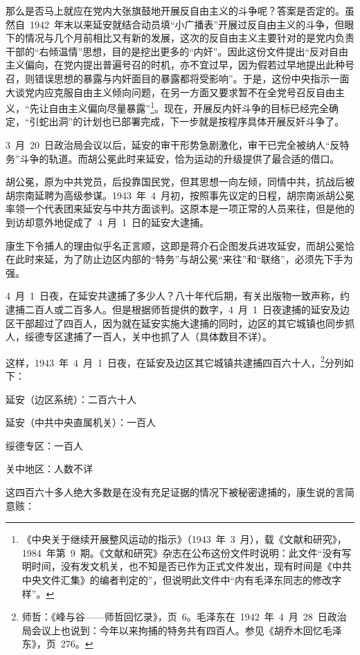 那么是否马上就应在党内大张旗鼓地开展反自由主义的斗争呢？答案是否定的。虽然自~1942~年末以来延安就结合动员填“小广播表”开展过反自由主义的斗争，但眼下的情况与几个月前相比又有新的发展，这次的反自由主义主要针对的是党内负责干部的“右倾温情”思想，目的是挖出更多的“内奸”。因此这份文件提出“反对自由主义偏向，在党内提出普遍号召的时机，亦不宜过早，因为假若过早地提出此种号召，则错误思想的暴露与内奸面目的暴露都将受影响”。于是，这份中央指示一面大谈党内应克服自由主义倾向问题，在另一方面又要求暂不在全党号召反自由主义，“先让自由主义偏向尽量暴露”\footnote{《中央关于继续开展整风运动的指示》（1943~年~3~月），载《文献和研究》，1984~年第~9~期。《文献和研究》杂志在公布这份文件时说明：此文件“没有写明时间，没有发文机关，也不知是否已作为正式文件发出，现有时间是《中共中央文件汇集》的编者判定的”，但说明此文件中“内有毛泽东同志的修改字样”。}。现在，开展反内奸斗争的目标已经完全确定，“引蛇出洞”的计划也已部署完成，下一步就是按程序具体开展反奸斗争了。

3~月~20~日政治局会议以后，延安的审干形势急剧激化，审干已完全被纳人“反特务”斗争的轨道。而胡公冕此时来延安，恰为运动的升级提供了最合适的借口。

胡公冕，原为中共党员，后投靠国民党，但其思想一向左倾，同情中共，抗战后被胡宗南延聘为高级参谋。1943~年~4~月初，按照事先议定的日程，胡宗南派胡公冕率领一个代表团来延安与中共方面谈判。这原本是一项正常的人员来往，但是他的到访却意外地促成了~4~月~1~日的延安大逮捕。

康生下令捕人的理由似乎名正言顺，这即是蒋介石企图发兵进攻延安，而胡公冕恰在此时来延，为了防止边区内部的“特务”与胡公冕“来往”和“联络”，必须先下手为强。

4~月~1~日夜，在延安共逮捕了多少人？八十年代后期，有关出版物一致声称，约逮捕二百人或二百多人。但是根据师哲提供的数字，4~月~1~日夜逮捕的延安及边区干部超过了四百人，因为就在延安实施大逮捕的同时，边区的其它城镇也同步抓人，绥德专区逮捕了一百人，关中也抓了人（具体数目不详）。

这样，1943~年~4~月~1~日夜，在延安及边区其它城镇共逮捕四百六十人，\footnote{师哲：《峰与谷——师哲回忆录》，页~6。毛泽东在~1942~年~4~月~28~日政治局会议上也说到：今年以来拘捕的特务共有四百人。参见《胡乔木回忆毛泽东》，页~276。}分列如下：

延安（边区系统）：二百六十人

延安（中共中央直属机关）：一百人

绥德专区：一百人

关中地区：人数不详

这四百六十多人绝大多数是在没有充足证据的情况下被秘密逮捕的，康生说的言简意赅：

